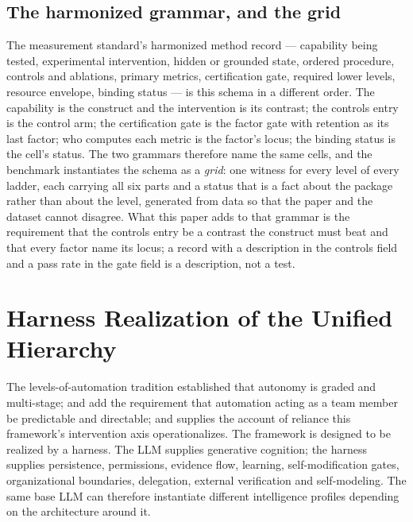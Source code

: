 \documentclass[11pt]{article}
\theoremstyle{definition}
\begin{document}
\subsection{The harmonized grammar, and the grid}
The measurement standard's harmonized method record --- capability being tested, experimental intervention, hidden or grounded state, ordered procedure, controls and ablations, primary metrics, certification gate, required lower levels, resource envelope, binding status --- is this schema in a different order. The capability is the construct and the intervention is its contrast; the controls entry is the control arm; the certification gate is the factor gate with retention as its last factor; who computes each metric is the factor's locus; the binding status is the cell's status. The two grammars therefore name the same cells, and the benchmark instantiates the schema as a \emph{grid}: one witness for every level of every ladder, each carrying all six parts and a status that is a fact about the package rather than about the level, generated from data so that the paper and the dataset cannot disagree. What this paper adds to that grammar is the requirement that the controls entry be a contrast the construct must beat and that every factor name its locus; a record with a description in the controls field and a pass rate in the gate field is a description, not a test.

\section{Harness Realization of the Unified Hierarchy}

The levels-of-automation tradition \citep{sheridan1978,parasuraman2000,endsley1999} established that autonomy is graded and multi-stage; \citet{klein2004} and \citet{amershi2019} add the requirement that automation acting as a team member be predictable and directable; and \citet{lee2004} supplies the account of reliance this framework's intervention axis operationalizes. The framework is designed to be realized by a harness. The LLM supplies generative cognition; the harness supplies persistence, permissions, evidence flow, learning, self-modification gates, organizational boundaries, delegation, external verification and self-modeling. The same base LLM can therefore instantiate different intelligence profiles depending on the architecture around it.
\end{document}

